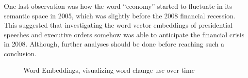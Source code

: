 \documentclass{article}
\begin{document}
{{One last observation was how the word “economy” started to fluctuate in its semantic space in 2005, which was slightly before the 2008 financial recession. This suggested that investigating the word vector embeddings of presidential speeches and executive orders somehow was able to anticipate the financial crisis in 2008. Although, further analyses should be done before reaching such a conclusion.
}
\begin{figure}[H]
	\caption{\label{fig:my-label7} Word Embeddings, visualizing word change use over time}
\end{figure}
}
\newpage
\end{document}
